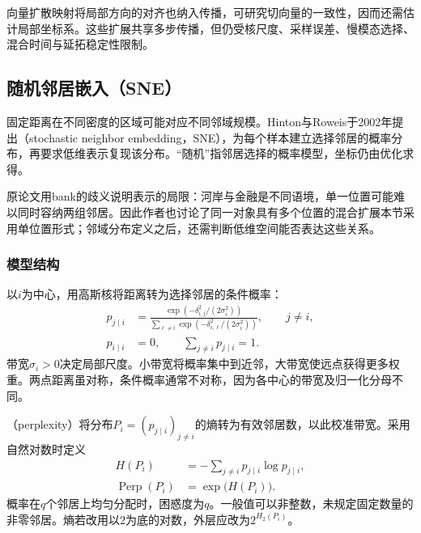 向量扩散映射将局部方向的对齐也纳入传播，可研究切向量的一致性，因而还需估计局部坐标系。这些扩展共享多步传播，但仍受核尺度、采样误差、慢模态选择、混合时间与延拓稳定性限制。

\subsection{随机邻居嵌入（SNE）}
\label{sec:dim-sne}

固定距离在不同密度的区域可能对应不同邻域规模。Hinton与Roweis于2002年提出（stochastic neighbor embedding，SNE），为每个样本建立选择邻居的概率分布，再要求低维表示复现该分布。“随机”指邻居选择的概率模型，坐标仍由优化求得。

原论文用bank的歧义说明表示的局限：河岸与金融是不同语境，单一位置可能难以同时容纳两组邻居。因此作者也讨论了同一对象具有多个位置的混合扩展本节采用单位置形式；邻域分布定义之后，还需判断低维空间能否表达这些关系。

\subsubsection{模型结构}

以$i$为中心，用高斯核将距离转为选择邻居的条件概率：
\begin{equation}
  \label{eq:dim-sne-high}
  \begin{aligned}
    p_{j\mid i}
      &=\frac{\exp(-\delta_{i,j}^2/(2\sigma_i^2))}
      {\sum_{\ell\ne i}\exp(-\delta_{i,\ell}^2/(2\sigma_i^2))},
      \qquad j\ne i,\\
    p_{i\mid i}&=0,\qquad \sum_{j\ne i}p_{j\mid i}=1.
  \end{aligned}
\end{equation}
带宽$\sigma_i>0$决定局部尺度。小带宽将概率集中到近邻，大带宽使远点获得更多权重。两点距离虽对称，条件概率通常不对称，因为各中心的带宽及归一化分母不同。

（perplexity）将分布$P_i=(p_{j\mid i})_{j\ne i}$的熵转为有效邻居数，以此校准带宽。采用自然对数时定义
\begin{equation}
  \label{eq:dim-sne-perplexity}
  \begin{aligned}
    H(P_i)&=-\sum_{j\ne i}p_{j\mid i}\log p_{j\mid i},\\
    \operatorname{Perp}(P_i)&=\exp\!\bigl(H(P_i)\bigr).
  \end{aligned}
\end{equation}
概率在$q$个邻居上均匀分配时，困惑度为$q$。一般值可以非整数，未规定固定数量的非零邻居。熵若改用以$2$为底的对数，外层应改为$2^{H_2(P_i)}$。

